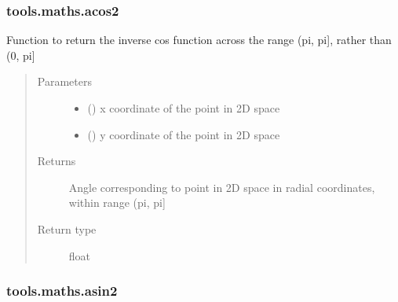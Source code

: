 \documentclass[letterpaper,10pt,english]{sphinxmanual}
\begin{document}
\subsubsection{tools.maths.acos2}
\label{\detokenize{_autosummary/tools.maths.acos2:tools-maths-acos2}}\label{\detokenize{_autosummary/tools.maths.acos2::doc}}

\begin{fulllineitems}
\label{\detokenize{_autosummary/tools.maths.acos2:tools.maths.acos2}}
\sphinxAtStartPar
Function to return the inverse cos function across the range (\sphinxhyphen{}pi, pi{]}, rather than (0, pi{]}
\begin{quote}\begin{description}
\item[{Parameters}] \leavevmode\begin{itemize}
\item {} 
\sphinxAtStartPar
{} () \textendash{} x coordinate of the point in 2D space

\item {} 
\sphinxAtStartPar
{} () \textendash{} y coordinate of the point in 2D space

\end{itemize}

\item[{Returns}] \leavevmode
\sphinxAtStartPar
{} \textendash{} Angle corresponding to point in 2D space in radial coordinates, within range (\sphinxhyphen{}pi, pi{]}

\item[{Return type}] \leavevmode
\sphinxAtStartPar
float

\end{description}\end{quote}

\end{fulllineitems}



\subsubsection{tools.maths.asin2}
\label{\detokenize{_autosummary/tools.maths.asin2:tools-maths-asin2}}\label{\detokenize{_autosummary/tools.maths.asin2::doc}}
\end{document}
